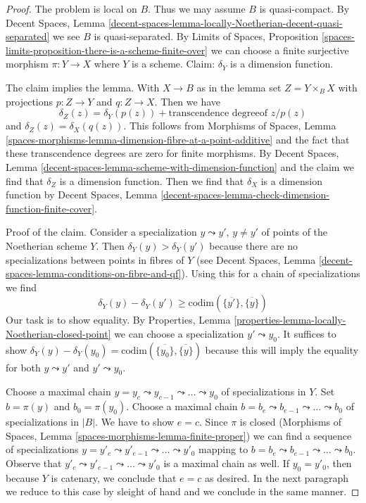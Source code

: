\begin{proof}
The problem is local on $B$. Thus we may assume $B$ is quasi-compact.
By Decent Spaces, Lemma
\ref{decent-spaces-lemma-locally-Noetherian-decent-quasi-separated}
we see $B$ is quasi-separated. By
Limits of Spaces, Proposition
\ref{spaces-limits-proposition-there-is-a-scheme-finite-over}
we can choose a finite surjective morphism $\pi : Y \to X$
where $Y$ is a scheme.
Claim: $\delta_Y$ is a dimension function.

\medskip\noindent
The claim implies the lemma. With $X \to B$ as in the lemma
set $Z = Y \times_B X$ with projections $p : Z \to Y$ and $q : Z \to X$.
Then we have
$$
\delta_Z(z) = \delta_Y(p(z)) + \text{transcendence degreeof }z/p(z)
$$
and $\delta_Z(z) = \delta_X(q(z))$. This follows from
Morphisms of Spaces, Lemma
\ref{spaces-morphisms-lemma-dimension-fibre-at-a-point-additive}
and the fact that these transcendence degrees are zero
for finite morphisms. By Decent Spaces, Lemma
\ref{decent-spaces-lemma-scheme-with-dimension-function}
and the claim we find that $\delta_Z$ is a dimension function.
Then we find that $\delta_X$ is a dimension function by
Decent Spaces, Lemma
\ref{decent-spaces-lemma-check-dimension-function-finite-cover}.

\medskip\noindent
Proof of the claim. Consider a specialization $y \leadsto y'$,
$y \not = y'$ of points of the Noetherian scheme $Y$.
Then $\delta_Y(y) > \delta_Y(y')$ because there are
no specializations between points in fibres of $Y$
(see Decent Spaces, Lemma
\ref{decent-spaces-lemma-conditions-on-fibre-and-qf}).
Using this for a chain of specializations we find
$$
\delta_Y(y) - \delta_Y(y') \geq
\text{codim}(\overline{\{y'\}}, \overline{\{y\}})
$$
Our task is to show equality. By
Properties, Lemma \ref{properties-lemma-locally-Noetherian-closed-point}
we can choose a specialization $y' \leadsto y_0$.
It suffices to show
$\delta_Y(y) - \delta_Y(y_0) =
\text{codim}(\overline{\{y_0\}}, \overline{\{y\}})$
because this will imply the equality for both
$y \leadsto y'$ and $y' \leadsto y_0$.

\medskip\noindent
Choose a maximal chain
$y = y_c \leadsto y_{c - 1} \leadsto \ldots \leadsto y_0$
of specializations in $Y$.
Set $b = \pi(y)$ and $b_0 = \pi(y_0)$.
Choose a maximal chain
$b = b_e \leadsto b_{e - 1} \leadsto \ldots \leadsto b_0$
of specializations in $|B|$.
We have to show $e = c$.
Since $\pi$ is closed
(Morphisms of Spaces, Lemma \ref{spaces-morphisms-lemma-finite-proper})
we can find a sequence of specializations
$y = y'_e \leadsto y'_{e - 1} \leadsto \ldots \leadsto y'_0$
mapping to
$b = b_e \leadsto b_{e - 1} \leadsto \ldots \leadsto b_0$.
Observe that $y'_e \leadsto y'_{e - 1} \leadsto \ldots \leadsto y'_0$
is a maximal chain as well.
If $y_0 = y'_0$, then because $Y$ is catenary, we conclude
that $e = c$ as desired. In the next paragraph we reduce to
this case by sleight of hand and we conclude in the same manner.


\end{proof}
